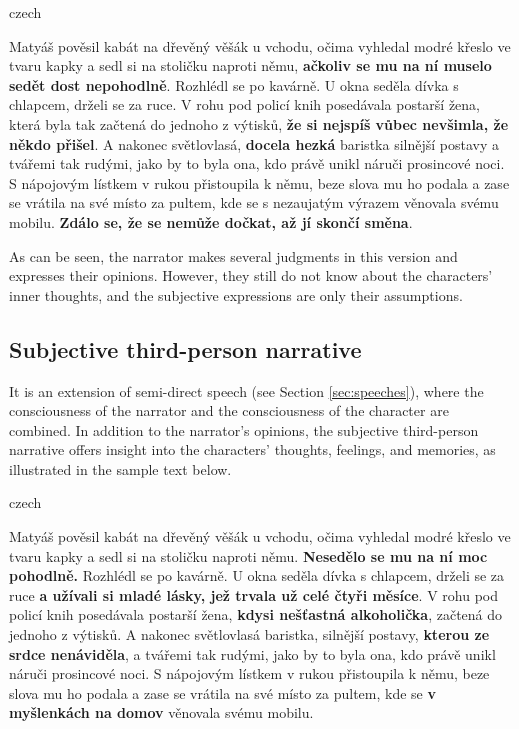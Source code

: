 \begin{otherlanguage*}{czech}
\begin{quoting}
Matyáš pověsil kabát na dřevěný věšák u vchodu, očima vyhledal modré křeslo ve tvaru kapky a sedl si na stoličku naproti němu, \textbf{ačkoliv se mu na ní muselo sedět dost nepohodlně}. Rozhlédl se po kavárně. U okna seděla dívka s chlapcem, drželi se za ruce. V rohu pod policí knih posedávala postarší žena, která byla tak začtená do jednoho z výtisků, \textbf{že si nejspíš vůbec nevšimla, že někdo přišel}. A nakonec světlovlasá, \textbf{docela hezká} baristka silnější postavy a tvářemi tak rudými, jako by to byla ona, kdo právě unikl náruči prosincové noci. S nápojovým lístkem v rukou přistoupila k němu, beze slova mu ho podala a zase se vrátila na své místo za pultem, kde se s nezaujatým výrazem věnovala svému mobilu. \textbf{Zdálo se, že se nemůže dočkat, až jí skončí směna}.
\newline
\end{quoting}
\end{otherlanguage*}

As can be seen, the narrator makes several judgments in this version and expresses their opinions. However, they still do not know about the characters' inner thoughts, and the subjective expressions are only their assumptions.

\subsection{Subjective third-person narrative}

It is an extension of semi-direct speech (see Section \ref{sec:speeches}), where the consciousness of the narrator and the consciousness of the character are combined. \cite[p.~393]{muller-sidak-slovnik}
In addition to the narrator's opinions, the subjective third-person narrative offers insight into the characters' thoughts, feelings, and memories, as illustrated in the sample text below.
\newline
\begin{otherlanguage*}{czech}
\begin{quoting}
Matyáš pověsil kabát na dřevěný věšák u vchodu, očima vyhledal modré křeslo ve tvaru kapky a sedl si na stoličku naproti němu. \textbf{Nesedělo se mu na ní moc pohodlně.} Rozhlédl se po kavárně. U okna seděla dívka s chlapcem, drželi se za ruce \textbf{a užívali si mladé lásky, jež trvala už celé čtyři měsíce}. V rohu pod policí knih posedávala postarší žena, \textbf{kdysi nešťastná alkoholička}, začtená do jednoho z výtisků. A nakonec světlovlasá baristka, silnější postavy, \textbf{kterou ze srdce nenáviděla}, a tvářemi tak rudými, jako by to byla ona, kdo právě unikl náruči prosincové noci. S nápojovým lístkem v rukou přistoupila k němu, beze slova mu ho podala a zase se vrátila na své místo za pultem, kde se \textbf{v myšlenkách na domov} věnovala svému mobilu.
\end{quoting}
\end{otherlanguage*}

